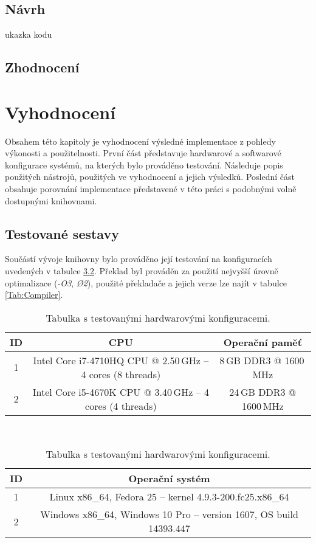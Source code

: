 \section{Návrh}
\blind[3]

ukazka kodu

\section{Zhodnocení}
\blind[3]


\chapter{Vyhodnocení}
\label{Chap:Results}

Obsahem této kapitoly je vyhodnocení výsledné implementace z pohledy výkonosti a použitelnosti. První část představuje hardwarové a softwarové konfigurace systémů, na kterých bylo prováděno testování. Následuje popis použitých nástrojů, použitých ve vyhodnocení a jejich výsledků. Poslední část obsahuje porovnání implementace představené v této práci s podobnými volně dostupnými knihovnami.

\section{Testované sestavy}

Součástí vývoje knihovny bylo prováděno její testování na konfiguracích uvedených v tabulce \ref{Tab:HW}. Překlad byl prováděn za použití nejvyšší úrovně optimalizace (\emph{-O3}, \emph{\O2}), použité překladače a jejich verze lze najít v tabulce \ref{Tab:Compiler}. 

\begin{table}[H]
	\begin{center}
		\begin{tabular}{| c | c | c |}
			\hline
			\textbf{ID} & \textbf{CPU} & \textbf{Operační paměť} \\
			\hline
			1 & Intel Core i7-4710HQ CPU @ 2.50\,GHz -- 4 cores (8 threads) & 8\,GB DDR3 @ 1600\,MHz \\
			\hline
			2 & Intel Core i5-4670K CPU @ 3.40\,GHz -- 4 cores (4 threads) & 24\,GB DDR3 @ 1600\,MHz \\
			\hline
		\end{tabular}\\[1em]
		\begin{tabular}{| c | c |}
			\hline
			\textbf{ID} & \textbf{Operační systém} \\
			\hline
			1 & Linux x86\_64, Fedora 25 -- kernel 4.9.3-200.fc25.x86\_64 \\
			\hline
			2 & Windows x86\_64, Windows 10 Pro -- version 1607, OS build 14393.447 \\
			\hline
		\end{tabular}
		\caption{Tabulka s testovanými hardwarovými konfiguracemi.}
		\label{Tab:HW}
	\end{center}
\end{table}

